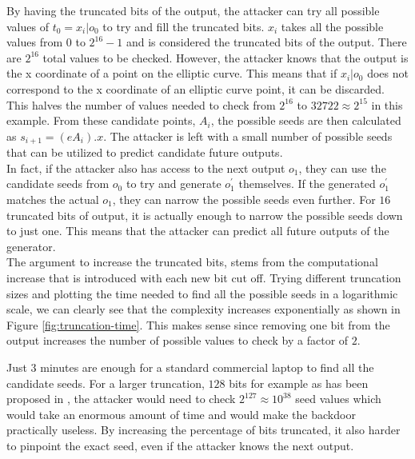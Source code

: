 By having the truncated bits of the output, the attacker can try all possible values of $t_0 = x_i | o_0$ to try and fill the truncated bits. $x_i$ takes all the possible values from $0$ to $2^{16} - 1$ and is considered the truncated bits of the output. There are $2^{16}$ total values to be checked. However, the attacker knows that the output is the x coordinate of a point on the elliptic curve. This means that if $x_i | o_0$ does not correspond to the x coordinate of an elliptic curve point, it can be discarded. This halves the number of values needed to check from $2^{16}$ to $32722 \approx 2^{15}$ in this example. From these candidate points, $A_i$, the possible seeds are then calculated as $s_{i + 1} = (eA_i).x$. The attacker is left with a small number of possible seeds that can be utilized to predict candidate future outputs.
\\

In fact, if the attacker also has access to the next output $o_1$, they can use the candidate seeds from $o_0$ to try and generate $o_1^\prime$ themselves. If the generated $o_1^\prime$ matches the actual $o_1$, they can narrow the possible seeds even further. For $16$ truncated bits of output, it is actually enough to narrow the possible seeds down to just one. This means that the attacker can predict all future outputs of the generator.
\\

The argument to increase the truncated bits, stems from the computational increase that is introduced with each new bit cut off. Trying different truncation sizes and plotting the time needed to find all the possible seeds in a logarithmic scale, we can clearly see that the complexity increases exponentially as shown in Figure \ref{fig:truncation-time}. This makes sense since removing one bit from the output increases the number of possible values to check by a factor of $2$.


Just 3 minutes are enough for a standard commercial laptop to find all the candidate seeds. For a larger truncation, $128$ bits for example as has been proposed in \cite{backdoor}, the attacker would need to check $2^{127} \approx 10^{38}$ seed values which would take an enormous amount of time and would make the backdoor practically useless. By increasing the percentage of bits truncated, it also harder to pinpoint the exact seed, even if the attacker knows the next output.
\\

